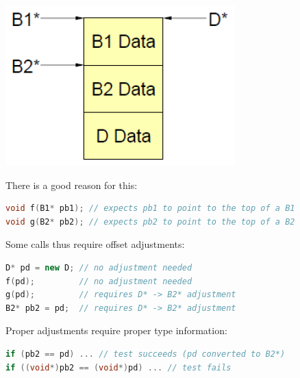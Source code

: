 \hfill
\begin{minipage}{0.2\linewidth}
\begin{center}
  \includegraphics[width=\linewidth]{images/AdvancedCPP/MI}
\end{center}
\end{minipage}
\vspace{0.5\baselineskip}
There is a good reason for this:
\begin{lstlisting}[language=C++]
void f(B1* pb1); // expects pb1 to point to the top of a B1
void g(B2* pb2); // expects pb2 to point to the top of a B2
\end{lstlisting}
Some calls thus require offset adjustments:
\begin{lstlisting}[language=C++]
D* pd = new D; // no adjustment needed
f(pd);         // no adjustment needed
g(pd);         // requires D* -> B2* adjustment
B2* pb2 = pd;  // requires D* -> B2* adjustment
\end{lstlisting}
Proper adjustments require proper type information:
\begin{lstlisting}[language=C++]
if (pb2 == pd) ... // test succeeds (pd converted to B2*)
if ((void*)pb2 == (void*)pd) ... // test fails
\end{lstlisting}

